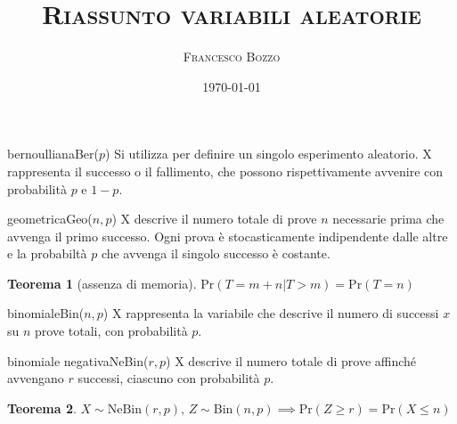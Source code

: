 \documentclass[
	,a4paper
	,12pt
	,oneside
]{article}
\title{\textsc{Riassunto variabili aleatorie}}
\author{\textsc{Francesco Bozzo}}
\date{\today}
\newtheorem*{theorem}{Teorema}
\begin{document}
\maketitle

\begin{aleatoria}{bernoulliana}{Ber(\(p\))}
	Si utilizza per definire un singolo esperimento aleatorio. X rappresenta il successo o il fallimento, che possono rispettivamente avvenire con probabilità \(p\) e \(1-p\).

\end{aleatoria}

\begin{aleatoria}{geometrica}{Geo(\(n, p\))}
	X descrive il numero totale di prove \(n\) necessarie prima che avvenga il primo successo. Ogni prova è stocasticamente indipendente dalle altre e la probabiltà \(p\) che avvenga il singolo successo è costante.

	\begin{theorem}[assenza di memoria]
		\(\text{Pr}(T=m+n|T>m) = \text{Pr}(T=n)\)
	\end{theorem}
\end{aleatoria}

\begin{aleatoria}{binomiale}{Bin(\(n, p\))}
	X rappresenta la variabile che descrive il numero di successi \(x\) su \(n\) prove totali, con probabilità \(p\).

\end{aleatoria}

\begin{aleatoria}{binomiale negativa}{NeBin(\(r, p\))}
	X descrive il numero totale di prove affinché avvengano \(r\) successi, ciascuno con probabilità \(p\).

	\begin{theorem}
		\(X\sim\text{NeBin}(r,p)\text{, } Z\sim\text{Bin}(n,p) \implies \text{Pr}(Z\geqslant r) = \text{Pr}(X\leqslant n)\)
	\end{theorem}
\end{aleatoria}
\end{document}
